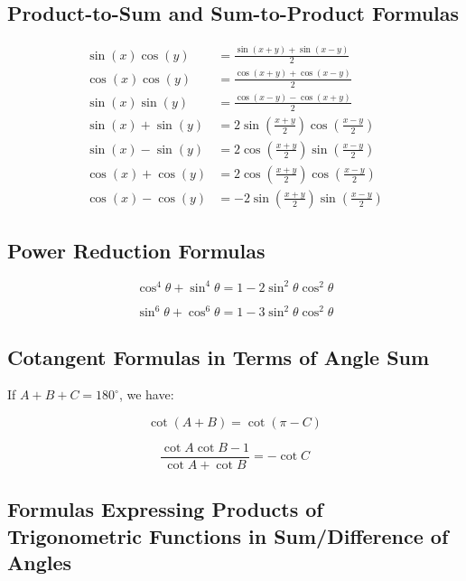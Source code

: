 \documentclass{article}
\begin{document}
\subsection{Product-to-Sum and Sum-to-Product Formulas}

\begin{align}
\sin(x)\cos(y) &= \frac{\sin(x+y) + \sin(x-y)}{2} \\
\cos(x)\cos(y) &= \frac{\cos(x+y) + \cos(x-y)}{2} \\
\sin(x)\sin(y) &= \frac{\cos(x-y) - \cos(x+y)}{2} \\
\sin(x)+\sin(y) &= 2\sin\left(\frac{x+y}{2}\right)\cos\left(\frac{x-y}{2}\right) \\
\sin(x)-\sin(y) &= 2\cos\left(\frac{x+y}{2}\right)\sin\left(\frac{x-y}{2}\right) \\
\cos(x)+\cos(y) &= 2\cos\left(\frac{x+y}{2}\right)\cos\left(\frac{x-y}{2}\right) \\
\cos(x)-\cos(y) &= -2\sin\left(\frac{x+y}{2}\right)\sin\left(\frac{x-y}{2}\right)
\end{align}

\subsection{Power Reduction Formulas}

\begin{equation}
\cos^4 \theta + \sin^4 \theta = 1 - 2\sin^2 \theta \cos^2 \theta
\end{equation}

\begin{equation}
\sin^6 \theta + \cos^6 \theta = 1 - 3\sin^2\theta \cos^2 \theta
\end{equation}

\subsection{Cotangent Formulas in Terms of Angle Sum}

If \(A + B + C = 180^{\circ}\), we have:

\begin{equation}
\cot (A + B) = \cot (\pi - C)
\end{equation}

\begin{equation}
\frac{\cot A \cot B - 1}{\cot A + \cot B} = -\cot C
\end{equation}

\subsection{Formulas Expressing Products of Trigonometric Functions in Sum/Difference of Angles}
\end{document}
